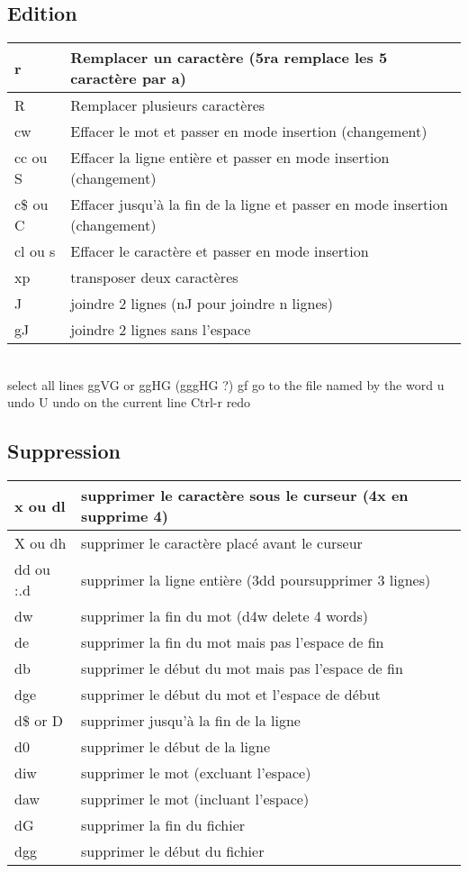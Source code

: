 \documentclass{article}
\begin{document}
\subsection{Edition}
\begin{tabular}{|p{3cm}| l|  }
	\hline
	r & Remplacer un caractère (5ra remplace les 5 caractère par a)\\ \hline
	R & Remplacer plusieurs caractères\\ \hline
	cw & Effacer le mot et passer en mode insertion (changement)\\ \hline
	cc ou S & Effacer la ligne entière et passer en mode insertion (changement)\\ \hline
	c\$ ou C & Effacer jusqu'à la fin de la ligne et passer en mode insertion (changement)\\ \hline
	cl ou s  & Effacer le caractère et passer en mode insertion \\ \hline
	xp & transposer deux caractères\\ \hline
	J & joindre 2 lignes (nJ pour joindre n lignes)\\ \hline
	gJ  &joindre 2 lignes sans l'espace\\ \hline
\end{tabular}\\

	select all lines ggVG or ggHG (gggHG ?)
	gf go to the file named by the word
	u undo
	U undo on the current line
	Ctrl-r redo
    
\subsection{Suppression}
\begin{tabular}{|p{3cm}| l|  }\hline
x ou dl & supprimer le caractère sous le curseur (4x en supprime 4)\\ \hline
X ou dh & supprimer le caractère placé avant le curseur\\ \hline
dd ou :.d & supprimer la ligne entière (3dd poursupprimer 3 lignes)\\ \hline
dw & supprimer la fin du mot (d4w delete 4 words)\\ \hline
de & supprimer la fin du mot mais pas l'espace de fin \\ \hline
db & supprimer le début du mot mais pas l'espace de fin\\ \hline
dge & supprimer le début du mot et l'espace de début\\ \hline
d\$ or D & supprimer jusqu'à la fin de la ligne\\ \hline
d0 & supprimer le début de la ligne\\ \hline
diw & supprimer le mot (excluant l'espace)\\ \hline
daw & supprimer le mot (incluant l'espace)\\ \hline
dG & supprimer la fin du fichier\\ \hline
dgg & supprimer le début du fichier\\ \hline
\end{tabular}\\
\end{document}

